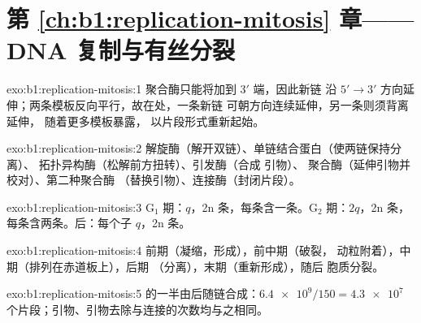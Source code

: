 \section*{第 \ref{ch:b1:replication-mitosis} 章——DNA 复制与有丝分裂}

\begin{solution}{exo:b1:replication-mitosis:1}
聚合酶只能将加到 $3'$ 端，因此新链
沿 $5' \to 3'$ 方向延伸；两条模板反向平行，故在处，一条新链
可朝方向连续延伸，另一条则须背离延伸，
随着更多模板暴露，
以片段形式重新起始。
\end{solution}

\begin{solution}{exo:b1:replication-mitosis:2}
解旋酶（解开双链）、单链结合蛋白（使两链保持分离）、
拓扑异构酶（松解前方扭转）、引发酶（合成  引物）、
 聚合酶（延伸引物并校对）、第二种聚合酶
（替换引物）、连接酶（封闭片段）。
\end{solution}

\begin{solution}{exo:b1:replication-mitosis:3}
G$_1$ 期：$q$，2n 条，每条含一条。G$_2$ 期：$2q$，2n
条，每条含两条。后：每个子 $q$，2n
条。
\end{solution}

\begin{solution}{exo:b1:replication-mitosis:4}
前期（凝缩，形成），前中期（破裂，
动粒附着），中期（排列在赤道板上），后期
（分离），末期（重新形成），随后
胞质分裂。
\end{solution}

\begin{solution}{exo:b1:replication-mitosis:5}
的一半由后随链合成：$\num{6.4e9}/150 =
\num{4.3e7}$ 个片段；引物、引物去除与连接的次数均与之相同。
\end{solution}

